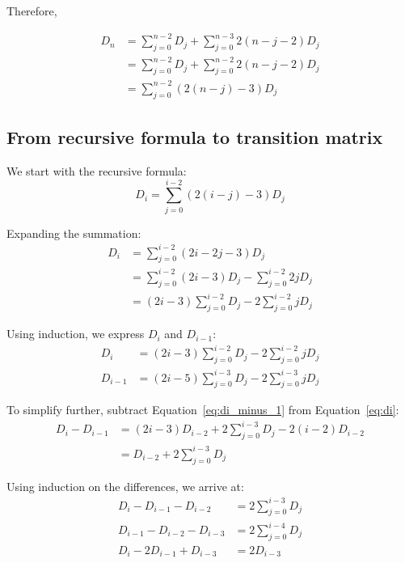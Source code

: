 Therefore, 

\begin{align*}
D_n &= \sum\limits_{j=0}^{n-2}D_j + \sum\limits_{j=0}^{n-3}2(n-j-2)D_j \\
    &= \sum\limits_{j=0}^{n-2}D_j + \sum\limits_{j=0}^{n-2}2(n-j-2)D_j \\
    &= \sum\limits_{j=0}^{n-2}(2(n-j)-3)D_j 
\end{align*}

\subsection{From recursive formula to transition matrix}

We start with the recursive formula:
\begin{equation}
    D_i = \sum\limits_{j = 0}^{i - 2}(2(i - j) - 3)D_j
\end{equation}

Expanding the summation:
\begin{align*}
    D_i &= \sum\limits_{j = 0}^{i - 2}(2i - 2j - 3)D_j \\
        &= \sum\limits_{j = 0}^{i - 2}(2i - 3)D_j - \sum\limits_{j = 0}^{i - 2}2jD_j \\
        &= (2i - 3)\sum\limits_{j = 0}^{i - 2}D_j - 2\sum\limits_{j = 0}^{i - 2}jD_j
\end{align*}

Using induction, we express $D_i$ and $D_{i - 1}$:
\begin{align}
    D_i &= (2i - 3)\sum\limits_{j = 0}^{i - 2}D_j - 2\sum\limits_{j = 0}^{i - 2}jD_j \label{eq:di} \\
    D_{i - 1} &= (2i - 5)\sum\limits_{j = 0}^{i - 3}D_j - 2\sum\limits_{j = 0}^{i - 3}jD_j \label{eq:di_minus_1}
\end{align}

To simplify further, subtract Equation~\eqref{eq:di_minus_1} from Equation~\eqref{eq:di}:
\begin{align*}
    D_i - D_{i - 1} &= (2i - 3)D_{i - 2} + 2 \sum\limits_{j = 0}^{i - 3}D_j - 2(i - 2)D_{i - 2} \\
                    &= D_{i - 2} + 2\sum\limits_{j = 0}^{i - 3}D_j
\end{align*}

Using induction on the differences, we arrive at:
\begin{align*}
    D_i - D_{i - 1} - D_{i - 2} &= 2\sum\limits_{j = 0}^{i - 3}D_j \\
    D_{i - 1} - D_{i - 2} - D_{i - 3} &= 2\sum\limits_{j = 0}^{i - 4}D_j \\
    D_i - 2D_{i - 1} + D_{i - 3} &= 2D_{i - 3}
\end{align*}

